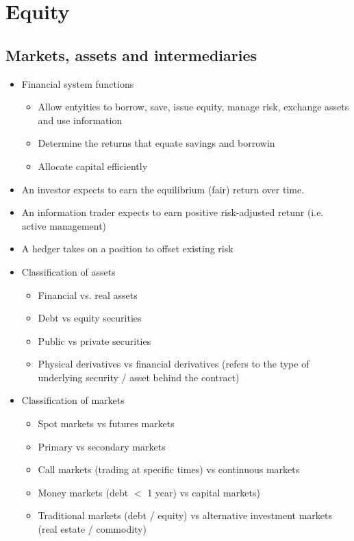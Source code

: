 \documentclass[../notes_compiled.tex]{subfiles}
\begin{document}
\section{Equity}
\subsection{Markets, assets and intermediaries}
\begin{itemize}
\item Financial system functions
\begin{itemize}
\item Allow entyities to borrow, save, issue equity, manage risk, exchange assets and use information
\item Determine the returns that equate savings and borrowin
\item Allocate capital efficiently
\end{itemize}
\item An investor expects to earn the equilibrium (fair) return over time.
\item An information trader expects to earn positive risk-adjusted retunr (i.e. active management)
\item A hedger takes on a position to offset existing risk

\item Classification of assets
\begin{itemize}
\item Financial vs. real assets
\item Debt vs equity securities
\item Public vs private securities
\item Physical derivatives vs financial derivatives (refers to the type of underlying security / asset behind the contract)
\end{itemize}

\item Classification of markets
\begin{itemize}
\item Spot markets vs futures markets
\item Primary vs secondary markets
\item Call markets (trading at specific times) vs continuous markets
\item Money markets (debt $<$ 1 year) vs capital markets)
\item Traditional markets (debt / equity) vs alternative investment markets (real estate / commodity)
\end{itemize}


\end{itemize}
\end{document}
